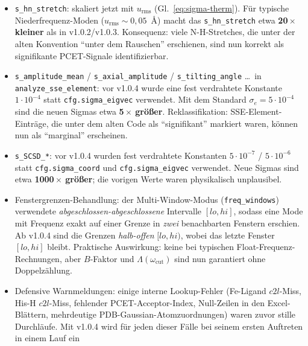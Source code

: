 \documentclass[11pt,a4paper,twoside]{article}
\newcommand{\urms}{u_{\mathrm{rms}}}
\theoremstyle{remark}
\begin{document}
\begin{itemize}\setlength{\itemsep}{2pt}
  \item \texttt{s\_hn\_stretch}: skaliert jetzt mit $\urms$
        (Gl.~\ref{eq:sigma-therm}). F\"ur typische Niederfrequenz-Moden
        ($\urms \sim 0{,}05$~\AA) macht das \texttt{s\_hn\_stretch}
        etwa \textbf{20\,$\times$ kleiner} als in v1.0.2/v1.0.3.
        Konsequenz: viele N-H-Stretches, die unter der alten
        Konvention ``unter dem Rauschen'' erschienen, sind nun
        korrekt als signifikante PCET-Signale identifizierbar.
  \item \texttt{s\_amplitude\_mean} / \texttt{s\_axial\_amplitude} /
        \texttt{s\_tilting\_angle} \ldots\ in
        \texttt{analyze\_sse\_element}: vor v1.0.4 wurde eine fest
        verdrahtete Konstante $1\cdot 10^{-4}$ statt
        \texttt{cfg.sigma\_eigvec} verwendet. Mit dem Standard
        $\sigma_e = 5\cdot 10^{-4}$ sind die neuen Sigmas
        etwa \textbf{5\,$\times$ gr\"o\ss er}. Reklassifikation:
        SSE-Element-Eintr\"age, die unter dem alten Code als
        ``signifikant'' markiert waren, k\"onnen nun als
        ``marginal'' erscheinen.
  \item \texttt{s\_SCSD\_*}: vor v1.0.4 wurden fest verdrahtete
        Konstanten $5\cdot 10^{-7}$ / $5\cdot 10^{-6}$ statt
        \texttt{cfg.sigma\_coord} und \texttt{cfg.sigma\_eigvec}
        verwendet. Neue Sigmas sind etwa \textbf{1000\,$\times$
        gr\"o\ss er}; die vorigen Werte waren physikalisch
        unplausibel.
  \item Fenstergrenzen-Behandlung: der Multi-Window-Modus
        (\texttt{freq\_windows}) verwendete \emph{abgeschlossen-abgeschlossene}
        Intervalle $[lo, hi]$, sodass eine Mode mit Frequenz exakt
        auf einer Grenze in \emph{zwei} benachbarten Fenstern
        erschien. Ab v1.0.4 sind die Grenzen \emph{halb-offen}
        $[lo, hi)$, wobei das letzte Fenster $[lo, hi]$ bleibt.
        Praktische Auswirkung: keine bei typischen Float-Frequenz-
        Rechnungen, aber $B$-Faktor und
        $\Lambda(\omega_\text{cut})$ sind nun garantiert ohne
        Doppelz\"ahlung.
  \item Defensive Warnmeldungen: einige interne Lookup-Fehler
        (Fe-Ligand $c2l$-Miss, His-H $c2l$-Miss, fehlender
        PCET-Acceptor-Index, Null-Zeilen in den Excel-Bl\"attern,
        mehrdeutige PDB-Gaussian-Atomzuordnungen) waren zuvor
        stille Durchl\"aufe. Mit v1.0.4 wird f\"ur jeden dieser
        F\"alle bei seinem ersten Auftreten in einem Lauf ein

\end{itemize}
\end{document}
